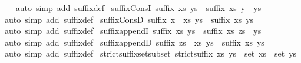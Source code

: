 \begin{isabellebody}
%
\isadelimproof
\ \ %
\endisadelimproof
%
\isatagproof
{}\isamarkupfalse%
\ {\isacharparenleft}auto\ simp\ add{\isacharcolon}\ suffix{\isacharunderscore}def{\isacharparenright}%
\endisatagproof
{\isafoldproof}%
%
\isadelimproof
\isanewline
%
\endisadelimproof
\isanewline
{}\isamarkupfalse%
\ suffix{\isacharunderscore}ConsI{\isacharcolon}\ {\isachardoublequoteopen}suffix\ xs\ ys\ {\isasymLongrightarrow}\ suffix\ xs\ {\isacharparenleft}y\ {\isacharhash}\ ys{\isacharparenright}{\isachardoublequoteclose}\isanewline
%
\isadelimproof
\ \ %
\endisadelimproof
%
\isatagproof
{}\isamarkupfalse%
\ {\isacharparenleft}auto\ simp\ add{\isacharcolon}\ suffix{\isacharunderscore}def{\isacharparenright}%
\endisatagproof
{\isafoldproof}%
%
\isadelimproof
\isanewline
%
\endisadelimproof
\isanewline
{}\isamarkupfalse%
\ suffix{\isacharunderscore}ConsD{\isacharcolon}\ {\isachardoublequoteopen}suffix\ {\isacharparenleft}x\ {\isacharhash}\ xs{\isacharparenright}\ ys\ {\isasymLongrightarrow}\ suffix\ xs\ ys{\isachardoublequoteclose}\isanewline
%
\isadelimproof
\ \ %
\endisadelimproof
%
\isatagproof
{}\isamarkupfalse%
\ {\isacharparenleft}auto\ simp\ add{\isacharcolon}\ suffix{\isacharunderscore}def{\isacharparenright}%
\endisatagproof
{\isafoldproof}%
%
\isadelimproof
\isanewline
%
\endisadelimproof
\isanewline
{}\isamarkupfalse%
\ suffix{\isacharunderscore}appendI{\isacharcolon}\ {\isachardoublequoteopen}suffix\ xs\ ys\ {\isasymLongrightarrow}\ suffix\ xs\ {\isacharparenleft}zs\ {\isacharat}\ ys{\isacharparenright}{\isachardoublequoteclose}\isanewline
%
\isadelimproof
\ \ %
\endisadelimproof
%
\isatagproof
{}\isamarkupfalse%
\ {\isacharparenleft}auto\ simp\ add{\isacharcolon}\ suffix{\isacharunderscore}def{\isacharparenright}%
\endisatagproof
{\isafoldproof}%
%
\isadelimproof
\isanewline
%
\endisadelimproof
\isanewline
{}\isamarkupfalse%
\ suffix{\isacharunderscore}appendD{\isacharcolon}\ {\isachardoublequoteopen}suffix\ {\isacharparenleft}zs\ {\isacharat}\ xs{\isacharparenright}\ ys\ {\isasymLongrightarrow}\ suffix\ xs\ ys{\isachardoublequoteclose}\isanewline
%
\isadelimproof
\ \ %
\endisadelimproof
%
\isatagproof
{}\isamarkupfalse%
\ {\isacharparenleft}auto\ simp\ add{\isacharcolon}\ suffix{\isacharunderscore}def{\isacharparenright}%
\endisatagproof
{\isafoldproof}%
%
\isadelimproof
\isanewline
%
\endisadelimproof
\isanewline
{}\isamarkupfalse%
\ strict{\isacharunderscore}suffix{\isacharunderscore}set{\isacharunderscore}subset{\isacharcolon}\ {\isachardoublequoteopen}strict{\isacharunderscore}suffix\ xs\ ys\ {\isasymLongrightarrow}\ set\ xs\ {\isasymsubseteq}\ set\ ys{\isachardoublequoteclose}\isanewline

\end{isabellebody}
